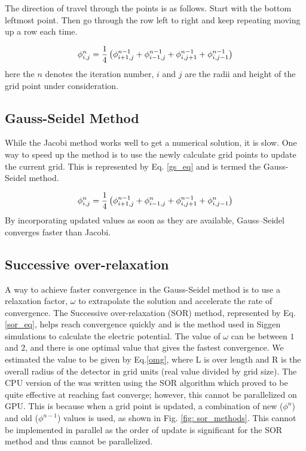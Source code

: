 The direction of travel through the points is as follows. Start with the bottom leftmost point. Then go through the row left to right and keep repeating moving up a row each time.


\begin{equation}{\label{jacobi}}
 \phi_{i,j}^{n} = \frac{1}{4}  \left(\phi^{n-1}_{i+1,j} + \phi^{n-1}_{i-1,j} + \phi^{n-1}_{i,j+1} + \phi^{n-1}_{i,j-1} \right)
\end{equation}
here the $n$ denotes the iteration number, $i$ and $j$ are the radii and height of the grid point under consideration. 

\subsection{Gauss-Seidel Method}

While the Jacobi method works well to get a numerical solution, it is slow. One way to speed up the method is to use the newly calculate grid points to update the current grid. This is represented by Eq. \ref{gs_eq} and is termed the Gauss-Seidel method.


\begin{equation}{\label{gs_eq}}
 \phi_{i,j}^{n} = \frac{1}{4}  \left(\phi^{n-1}_{i+1,j} + \phi^n_{i-1,j} + \phi^{n-1}_{i,j+1} + \phi^n_{i,j-1} \right)
\end{equation}
By incorporating updated values as soon as they are available, Gauss--Seidel converges faster than Jacobi.

\subsection{Successive over-relaxation}

A way to achieve faster convergence in the Gauss-Seidel method is to use a relaxation factor, $\omega$ to extrapolate the solution and accelerate the rate of convergence. The Successive over-relaxation (SOR) method, represented by Eq. \ref{sor_eq}, helps reach convergence quickly and is the method used in Siggen simulations to calculate the electric potential. The value of $\omega$ can be between $1$ and $2$, and there is one optimal value that gives the fastest convergence. We estimated the value to be given by Eq.\ref{omg}, where L is over length and R is the overall radius of the detector in grid units (real value divided by grid size). The CPU version of the {\tdsim} was written using the SOR algorithm which proved to be quite effective at reaching fast converge; however, this cannot be parallelized on GPU. This is because when a grid point is updated, a combination of new ($\phi^{n}$) and old ($\phi^{n-1}$) values is used, as shown in Fig. \ref{fig: sor_methods}. This cannot be implemented in parallel as the order of update is significant for the SOR method and thus cannot be parallelized.

